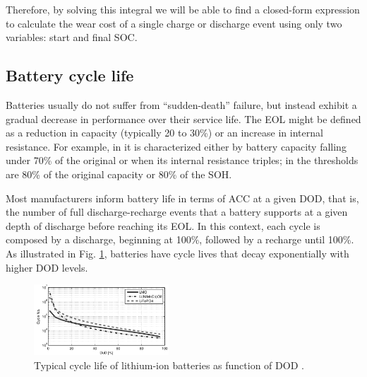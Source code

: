 \documentclass{ieeeaccess}
\begin{document}
	Therefore, by solving this integral we will be able to find a closed-form expression to calculate the wear cost of a single charge or discharge event using only two variables: start and final \ac{SOC}.
    
	

%


    \subsection{Battery cycle life}
    Batteries usually do not suffer from ``sudden-death'' failure, but instead exhibit a gradual decrease in performance over their service life. The \ac{EOL} might be defined as a reduction in capacity (typically 20 to 30\%) or an increase in internal resistance. For example, in \cite{ECKER2014} it is characterized either by battery capacity falling under 70\% of the original or when its internal resistance triples; in \cite{NARAYAN2018} the thresholds are 80\% of the original capacity or 80\% of the \ac{SOH}.

    Most manufacturers inform battery life in terms of \ac{ACC} at a given \ac{DOD}, that is, the number of full discharge-recharge events that a battery supports at a given depth of discharge before reaching its \ac{EOL}. In this context, each cycle is composed by a discharge, beginning at 100\%, followed by a recharge until 100\%. As illustrated in Fig. \ref{fig:acc_curves1}, batteries have cycle lives that decay exponentially with higher \ac{DOD} levels.

    \begin{figure}[htbp]
        \centering
        \includegraphics[width=0.45\textwidth]{figures/acc_curves1.png}
        \caption{Typical cycle life of lithium-ion batteries as function of \ac{DOD} \cite{XU2016}.}
        \label{fig:acc_curves1}
    \end{figure}
\end{document}
